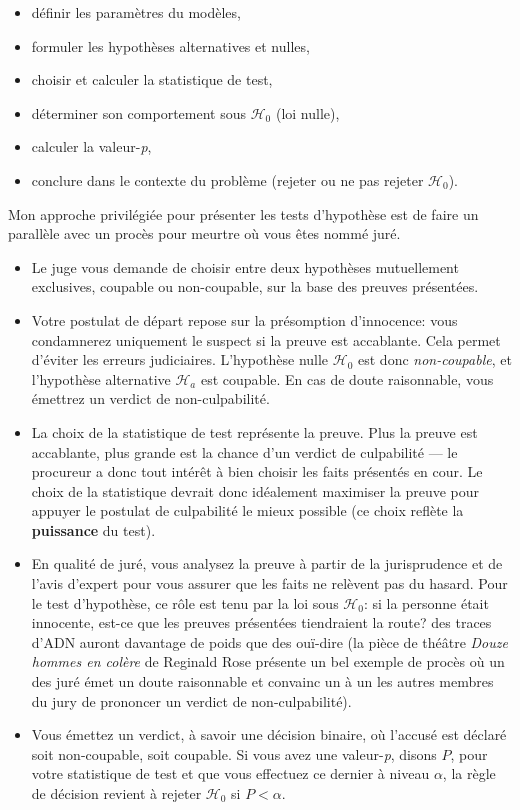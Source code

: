 \documentclass[
  11pt,
  letterpaper,
]{article}
\providecommand{\tightlist}{%
  \setlength{\itemsep}{0pt}\setlength{\parskip}{0pt}}
\theoremstyle{definition}
\theoremstyle{definition}
\theoremstyle{definition}
\theoremstyle{remark}
\begin{document}
\begin{itemize}
\tightlist
\item
  définir les paramètres du modèles,
\item
  formuler les hypothèses alternatives et nulles,
\item
  choisir et calculer la statistique de test,
\item
  déterminer son comportement sous \(\mathscr{H}_0\) (loi nulle),
\item
  calculer la valeur-\emph{p},
\item
  conclure dans le contexte du problème (rejeter ou ne pas rejeter \(\mathscr{H}_0\)).
\end{itemize}

Mon approche privilégiée pour présenter les tests d'hypothèse est de faire un parallèle avec un procès pour meurtre où vous êtes nommé juré.

\begin{itemize}
\tightlist
\item
  Le juge vous demande de choisir entre deux hypothèses mutuellement exclusives, coupable ou non-coupable, sur la base des preuves présentées.
\item
  Votre postulat de départ repose sur la présomption d'innocence: vous condamnerez uniquement le suspect si la preuve est accablante. Cela permet d'éviter les erreurs judiciaires. L'hypothèse nulle \(\mathscr{H}_0\) est donc \emph{non-coupable}, et l'hypothèse alternative \(\mathscr{H}_a\) est coupable. En cas de doute raisonnable, vous émettrez un verdict de non-culpabilité.
\item
  La choix de la statistique de test représente la preuve. Plus la preuve est accablante, plus grande est la chance d'un verdict de culpabilité --- le procureur a donc tout intérêt à bien choisir les faits présentés en cour. Le choix de la statistique devrait donc idéalement maximiser la preuve pour appuyer le postulat de culpabilité le mieux possible (ce choix reflète la \textbf{puissance} du test).
\item
  En qualité de juré, vous analysez la preuve à partir de la jurisprudence et de l'avis d'expert pour vous assurer que les faits ne relèvent pas du hasard. Pour le test d'hypothèse, ce rôle est tenu par la loi sous \(\mathscr{H}_0\): si la personne était innocente, est-ce que les preuves présentées tiendraient la route? des traces d'ADN auront davantage de poids que des ouï-dire (la pièce de théâtre \emph{Douze hommes en colère} de Reginald Rose présente un bel exemple de procès où un des juré émet un doute raisonnable et convainc un à un les autres membres du jury de prononcer un verdict de non-culpabilité).
\item
  Vous émettez un verdict, à savoir une décision binaire, où l'accusé est déclaré soit non-coupable, soit coupable. Si vous avez une valeur-\emph{p}, disons \(P\), pour votre statistique de test et que vous effectuez ce dernier à niveau \(\alpha\), la règle de décision revient à rejeter \(\mathscr{H}_0\) si \(P < \alpha\).
\end{itemize}
\end{document}
